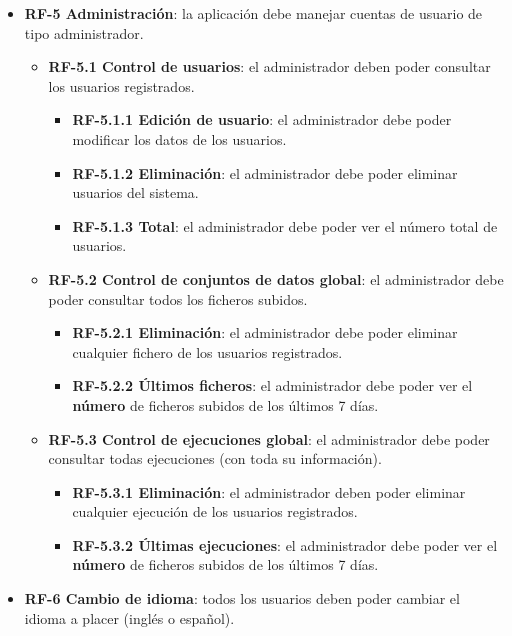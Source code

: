 \begin{itemize}
    \item \textbf{RF-5 Administración}: la aplicación debe manejar cuentas de
    usuario de tipo administrador.
    \begin{itemize}
        \item \textbf{RF-5.1 Control de usuarios}: el administrador deben poder
        consultar los usuarios registrados.
        \begin{itemize}
            \item \textbf{RF-5.1.1 Edición de usuario}: el administrador debe
            poder modificar los datos de los usuarios.
            \item \textbf{RF-5.1.2 Eliminación}: el administrador debe poder
            eliminar usuarios del sistema.
            \item \textbf{RF-5.1.3 Total}: el administrador debe poder ver el
            número total de usuarios.
        \end{itemize}
        \item \textbf{RF-5.2 Control de conjuntos de datos global}: el
        administrador debe poder consultar todos los ficheros subidos.
        \begin{itemize}          
            \item \textbf{RF-5.2.1 Eliminación}: el administrador debe poder
            eliminar cualquier fichero de los usuarios registrados.
            \item \textbf{RF-5.2.2 Últimos ficheros}: el administrador debe
            poder ver el \textbf{número} de ficheros subidos de los últimos 7
            días.
        \end{itemize}
        \item \textbf{RF-5.3 Control de ejecuciones global}: el administrador
        debe poder consultar todas ejecuciones (con toda su información).
        \begin{itemize}          
            \item \textbf{RF-5.3.1 Eliminación}: el administrador deben poder
            eliminar cualquier ejecución de los usuarios registrados.
            \item \textbf{RF-5.3.2 Últimas ejecuciones}: el administrador debe
            poder ver el \textbf{número} de ficheros subidos de los últimos 7
            días.
        \end{itemize}
    \end{itemize}

    \item \textbf{RF-6 Cambio de idioma}: todos los usuarios deben poder cambiar
    el idioma a placer (inglés o español).

\end{itemize}

